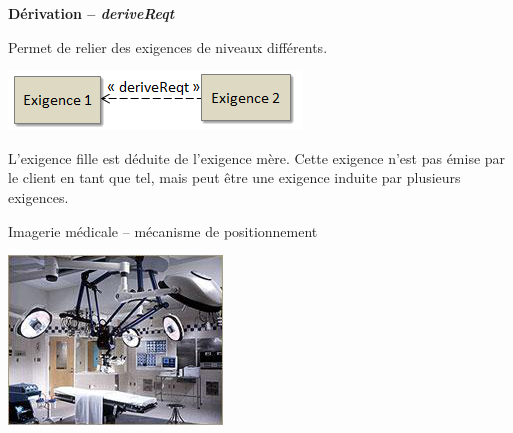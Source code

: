 \documentclass[11pt,oneside]{article}
\begin{document}
\begin{defi}
\textbf{Dérivation -- \textit{deriveReqt}}

Permet de relier des exigences de niveaux différents. 

\begin{minipage}[c]{.6\linewidth}
\end{minipage} \hfill
\begin{minipage}[c]{.3\linewidth}
\begin{center}
\includegraphics[width=.9\textwidth]{png/derivreq}
\end{center}
\end{minipage}

\end{defi}

L'exigence fille est déduite de l'exigence mère. Cette exigence n'est pas émise par le client en tant que tel, mais peut être une exigence induite par plusieurs exigences. 


\begin{minipage}[c]{.5\linewidth}
Imagerie médicale -- mécanisme de positionnement
\end{minipage} \hfill
\begin{minipage}[c]{.3\linewidth}
\begin{center}
\includegraphics[width=.9\textwidth]{png/imagerie}
\end{center}
\end{minipage}
\end{document}
